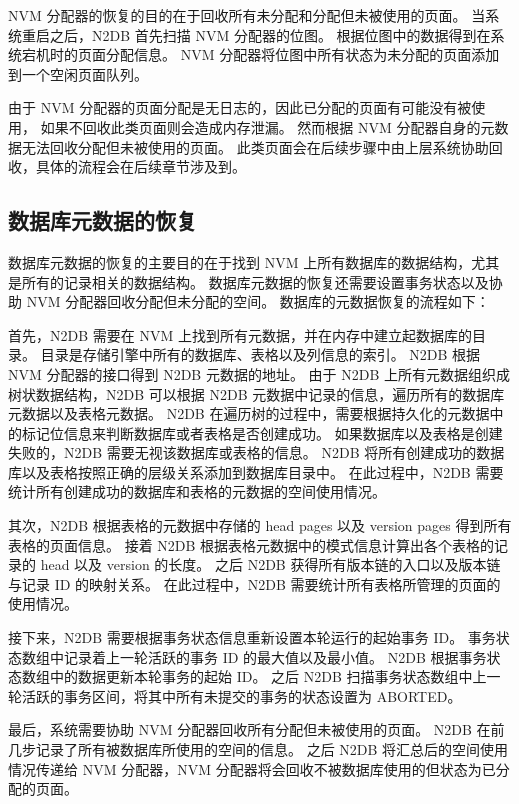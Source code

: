 NVM 分配器的恢复的目的在于回收所有未分配和分配但未被使用的页面。
当系统重启之后，N2DB 首先扫描 NVM 分配器的位图。
根据位图中的数据得到在系统宕机时的页面分配信息。
NVM 分配器将位图中所有状态为未分配的页面添加到一个空闲页面队列。

由于 NVM 分配器的页面分配是无日志的，因此已分配的页面有可能没有被使用，
如果不回收此类页面则会造成内存泄漏。
然而根据 NVM 分配器自身的元数据无法回收分配但未被使用的页面。
此类页面会在后续步骤中由上层系统协助回收，具体的流程会在后续章节涉及到。

\subsection{数据库元数据的恢复}
\label{ssec:metadata-recovery}

数据库元数据的恢复的主要目的在于找到 NVM 上所有数据库的数据结构，尤其是所有的记录相关的数据结构。
数据库元数据的恢复还需要设置事务状态以及协助 NVM 分配器回收分配但未分配的空间。
数据库的元数据恢复的流程如下：

首先，N2DB 需要在 NVM 上找到所有元数据，并在内存中建立起数据库的目录。
目录是存储引擎中所有的数据库、表格以及列信息的索引。
N2DB 根据 NVM 分配器的接口得到 N2DB 元数据的地址。
由于 N2DB 上所有元数据组织成树状数据结构，N2DB 可以根据 N2DB 元数据中记录的信息，遍历所有的数据库元数据以及表格元数据。
N2DB 在遍历树的过程中，需要根据持久化的元数据中的标记位信息来判断数据库或者表格是否创建成功。
如果数据库以及表格是创建失败的，N2DB 需要无视该数据库或表格的信息。
N2DB 将所有创建成功的数据库以及表格按照正确的层级关系添加到数据库目录中。
在此过程中，N2DB 需要统计所有创建成功的数据库和表格的元数据的空间使用情况。

其次，N2DB 根据表格的元数据中存储的 head pages 以及 version pages 得到所有表格的页面信息。
接着 N2DB 根据表格元数据中的模式信息计算出各个表格的记录的 head 以及 version 的长度。
之后 N2DB 获得所有版本链的入口以及版本链与记录 ID 的映射关系。
在此过程中，N2DB 需要统计所有表格所管理的页面的使用情况。

接下来，N2DB 需要根据事务状态信息重新设置本轮运行的起始事务 ID。
事务状态数组中记录着上一轮活跃的事务 ID 的最大值以及最小值。
N2DB 根据事务状态数组中的数据更新本轮事务的起始 ID。
之后 N2DB 扫描事务状态数组中上一轮活跃的事务区间，将其中所有未提交的事务的状态设置为 ABORTED。

最后，系统需要协助 NVM 分配器回收所有分配但未被使用的页面。
N2DB 在前几步记录了所有被数据库所使用的空间的信息。
之后 N2DB 将汇总后的空间使用情况传递给 NVM 分配器，NVM 分配器将会回收不被数据库使用的但状态为已分配的页面。



